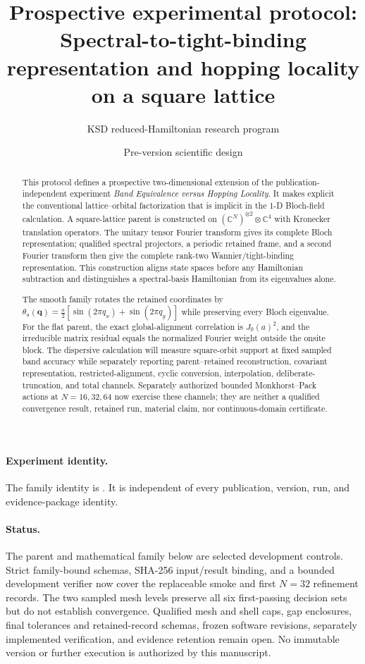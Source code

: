 \documentclass[11pt]{article}
\title{\textbf{Prospective experimental protocol:\\
Spectral-to-tight-binding representation and hopping locality\\
on a square lattice}}
\author{KSD reduced-Hamiltonian research program}
\date{Pre-version scientific design}
\begin{document}
\maketitle

\begin{abstract}
This protocol defines a prospective two-dimensional extension of the
publication-independent experiment \emph{Band Equivalence versus Hopping Locality}. It
makes explicit the conventional lattice--orbital factorization that is implicit in the
1-D Bloch-field calculation. A square-lattice parent is constructed on
$(\mathbb C^N)^{\otimes2}\otimes\mathbb C^4$ with Kronecker translation operators. The
unitary tensor Fourier transform gives its complete Bloch representation; qualified
spectral projectors, a periodic retained frame, and a second Fourier transform then give
the complete rank-two Wannier/tight-binding representation. This construction aligns
state spaces before any Hamiltonian subtraction and distinguishes a spectral-basis
Hamiltonian from its eigenvalues alone.

The smooth family rotates the retained coordinates by
$\theta_a(\mathbf q)=\tfrac a2[\sin(2\pi q_x)+\sin(2\pi q_y)]$ while preserving every
Bloch eigenvalue. For the flat parent, the exact global-alignment correlation is
$J_0(a)^2$, and the irreducible matrix residual equals the normalized Fourier weight
outside the onsite block. The dispersive calculation will measure square-orbit support
at fixed sampled band accuracy while separately reporting parent--retained
reconstruction, covariant representation, restricted-alignment, cyclic conversion,
interpolation, deliberate-truncation, and total channels. Separately authorized bounded
Monkhorst--Pack actions at $N=16,32,64$ now exercise these channels; they are neither a
qualified convergence result, retained run, material claim, nor continuous-domain
certificate.
\end{abstract}

\paragraph{Experiment identity.}
The family identity is
.
It is independent of every publication, version, run, and evidence-package identity.

\paragraph{Status.}
The parent and mathematical family below are selected development controls. Strict
family-bound schemas, SHA-256 input/result binding, and a bounded development verifier now
cover the replaceable smoke and first $N=32$ refinement records. The two sampled mesh
levels preserve all six first-passing decision sets but do not establish convergence.
Qualified mesh and shell caps, gap enclosures, final tolerances and retained-record
schemas, frozen software revisions, separately
implemented verification, and evidence retention remain open. No immutable version or
further execution is authorized by this manuscript.
\end{document}
